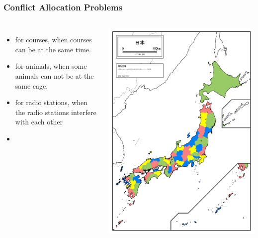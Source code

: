 \documentclass{beamer}
\begin{document}
\begin{frame}
  \frametitle{Conflict Allocation Problems}

  {\large

    \begin{columns}
      \begin{itemize}
      \item {} for courses, when
        courses can be \alert{at the same time}.
        
        \medskip
        
      \item {} for animals, when
        some animals \alert{can not be at the same cage}.
        
        \medskip
        
      \item {} for radio
        stations, when the radio stations \alert{interfere with
          each other}
        
        \medskip
        
      \item {}
        
      \end{itemize}

      \includegraphics[height=\textheight]{../img/japan4color}
    \end{columns}
  }
\end{frame}
\end{document}
